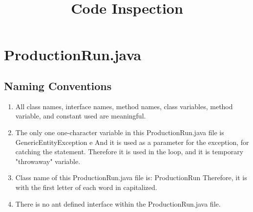 \documentclass{article}
\title{Code Inspection}
\begin{document}
\section{ProductionRun.java}

\subsection{Naming Conventions}
\begin{enumerate}
\item
All class names, interface names, method names, class variables, method variable, and constant used are meaningful.

\item
The only one one-character variable in this ProductionRun.java file is \newline
GenericEntityException e \newline
And it is used as a parameter for the exception, for catching the statement. Therefore it is used in the loop, and it is temporary "throwaway" variable.

\item
Class name of this ProductionRun.java file is: \newline
ProductionRun\newline
Therefore, it is with the first letter of each word in capitalized.

\item
There is no ant defined interface within the ProductionRun.java file.


\end{enumerate}
\end{document}

